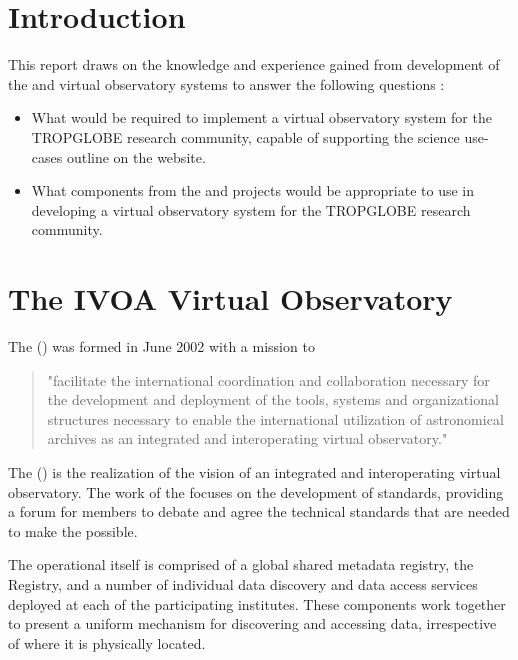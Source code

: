 \documentclass{article}
\begin{document}
\section{Introduction}

This report draws on the knowledge and experience gained from development of the
\cite{astro} and \cite{IVOA} virtual observatory systems to answer the following
questions :

\begin{itemize}
\item What would be required to implement a virtual observatory system for the
TROPGLOBE research community, capable of supporting the science use-cases outline
on the \cite{trop} website.

\item What components from the \cite{astro} and \cite{ivoa} projects would be
appropriate to use in developing a virtual observatory system for the TROPGLOBE
research community. 

\end{itemize}

\section{The IVOA Virtual Observatory}

The  (\cite{ivoa}) was formed in June 2002 with a mission to
\begin{quote}
"facilitate the international coordination and collaboration
necessary for the development and deployment of the tools, systems and
organizational structures necessary to enable the international utilization of
astronomical archives as an integrated and interoperating virtual observatory."
\end{quote}

The  (\cite{vo}) is the realization of the \cite{ivoa} vision of
an integrated and interoperating virtual observatory.
The work of the \cite{ivoa} focuses on the development of standards, providing a forum
for members to debate and agree the technical standards that are needed to make
the \cite{vo} possible.

The operational \cite{vo} itself is comprised of a global shared metadata registry,
the Registry, and a number of individual data discovery and data access services
deployed at each of the participating institutes.
These components work together to present a uniform mechanism for discovering
and accessing data, irrespective of where it is physically located.
\end{document}
